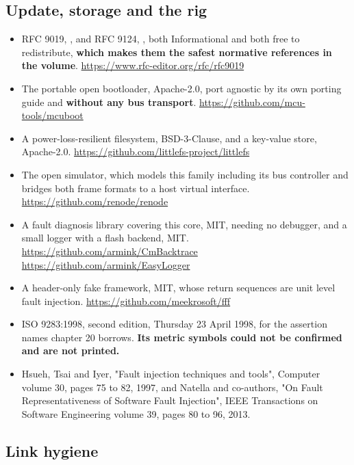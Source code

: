 \subsection*{Update, storage and the rig}

\begin{itemize}[itemsep=2pt]
\item RFC 9019, , and RFC 9124, , both Informational and
both free to redistribute, \textbf{which makes them the safest normative
references in the volume}.\newline
\url{https://www.rfc-editor.org/rfc/rfc9019}
\item The portable open bootloader, Apache-2.0, port agnostic by its own porting
guide and \textbf{without any bus transport}.\newline
\url{https://github.com/mcu-tools/mcuboot}
\item A power-loss-resilient filesystem, BSD-3-Clause, and a key-value store,
Apache-2.0.\newline
\url{https://github.com/littlefs-project/littlefs}
\item The open simulator, which models this family including its bus controller
and bridges both frame formats to a host virtual interface.\newline
\url{https://github.com/renode/renode}
\item A fault diagnosis library covering this core, MIT, needing no debugger, and
a small logger with a flash backend, MIT.\newline
\url{https://github.com/armink/CmBacktrace}\newline
\url{https://github.com/armink/EasyLogger}
\item A header-only fake framework, MIT, whose return sequences are unit level
fault injection.\newline
\url{https://github.com/meekrosoft/fff}
\item ISO 9283:1998, second edition, Thursday 23 April 1998, for the assertion
names chapter 20 borrows. \textbf{Its metric symbols could not be confirmed and
are not printed.}
\item Hsueh, Tsai and Iyer, "Fault injection techniques and tools", Computer
volume 30, pages 75 to 82, 1997, and Natella and co-authors, "On Fault
Representativeness of Software Fault Injection", IEEE Transactions on Software
Engineering volume 39, pages 80 to 96, 2013.
\end{itemize}

\subsection*{Link hygiene}

